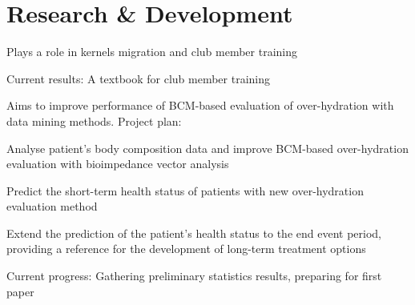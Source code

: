 \documentclass[]{deedy-resume-openfont}
\begin{document}
\hfill
\begin{minipage}[t]{0.73\textwidth} 


\section{Research \& Development}
\descript{}
\vspace{\topsep}
\begin{tightemize}
    \item Plays a role in kernels migration and club member training
    \item Current results: A textbook for club member training
\end{tightemize}
\sectionsep

\descript{}
\begin{tightemize}
\item Aims to improve performance of BCM-based evaluation of over-hydration with data mining methods. Project plan:
        \vspace{\topsep}
        \begin{tightemize}
            \item Analyse patient's body composition data and improve BCM-based over-hydration evaluation with bioimpedance vector analysis
            \item Predict the short-term health status of patients with new over-hydration evaluation method
            \item Extend the prediction of the patient's health status to the end event period, providing a reference for the development of long-term treatment options
        \end{tightemize}
        \vspace{\topsep}
		\item Current progress: Gathering preliminary statistics results, preparing for first paper
\end{tightemize}
\sectionsep


\end{minipage}
\end{document}

